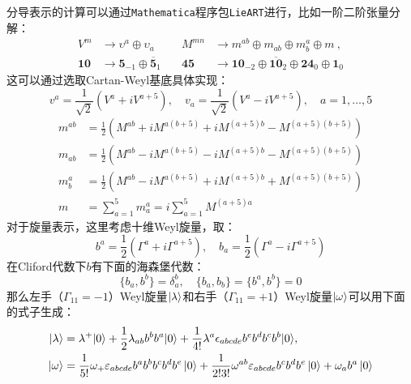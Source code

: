 分导表示的计算可以通过\texttt{Mathematica}程序包\texttt{LieART}\cite{FEGER2020107490}进行，比如一阶二阶张量分解：
\begin{equation}
	\begin{aligned}
		V^{m}&\to\upsilon^{a}\oplus\upsilon_{a}\quad&M^{mn}&\to m^{ab}\oplus m_{ab}\oplus m_{b}^{a}\oplus m\mathrm{~,}\\
		\mathbf{10}&\to\mathbf{5}_{-1}\oplus\mathbf{\overline{5}}_{1}\quad&\mathbf{45}&\to\mathbf{10}_{-2}\oplus\mathbf{\overline{10}}_{2}\oplus\mathbf{24}_{0}\oplus\mathbf{1}_{0}
		\end{aligned}
\end{equation}
这可以通过选取Cartan-Weyl基底具体实现：\cite{Nekrasov:2005wg}
\begin{equation}
	v^a=\frac{1}{\sqrt{2}}\left(V^a+iV^{a+5}\right),\quad v_a=\frac{1}{\sqrt{2}}\left(V^a-iV^{a+5}\right),\quad a=1,\ldots,5
\end{equation}
\begin{equation}
	\begin{aligned}
		m^{ab}&=\frac{1}{2}\left(M^{ab}+iM^{a(b+5)}+iM^{(a+5)b}-M^{(a+5)(b+5)}\right)\\
		m_{ab}&=\frac{1}{2}\left(M^{ab}-iM^{a(b+5)}-iM^{(a+5)b}-M^{(a+5)(b+5)}\right)\\
		m_b^a&=\frac{1}{2}\left(M^{ab}-iM^{a(b+5)}+iM^{(a+5)b}+M^{(a+5)(b+5)}\right)\\
		m&=\sum_{a=1}^5m_a^a=i\sum_{a=1}^5M^{(a+5)a}
	\end{aligned}
\end{equation}
对于旋量表示，这里考虑十维Weyl旋量，取：
\begin{equation}
	b^a=\frac{1}{2}\left(\Gamma^a+i\Gamma^{a+5}\right),\quad b_a=\frac{1}{2}\left(\Gamma^a-i\Gamma^{a+5}\right)
\end{equation}
在Cliford代数下$b$有下面的海森堡代数：
\begin{equation}
	\{b_a,b^b\}=\delta_a^b,\quad\{b_a,b_b\}=\{b^a,b^b\}=0
\end{equation}
那么左手（$\Gamma_{11}=-1$）Weyl旋量$\ket{\lambda}$和右手（$\Gamma_{11}=+1$）Weyl旋量$\ket{\omega}$可以用下面的式子生成：
\begin{equation}
	\begin{aligned}
		\left|\lambda\right\rangle&=\lambda^+|0\rangle+\frac{1}{2}\lambda_{ab}b^bb^a|0\rangle+\frac{1}{4!}\lambda^a\epsilon_{abcde}b^eb^db^cb^b|0\rangle,\\\left|{\omega}\right\rangle&=\frac{1}{5!}\omega_+\varepsilon_{abcde}b^ab^bb^cb^db^e\ket{0}+\frac{1}{2!3!}\omega^{ab}\varepsilon_{abcde}b^cb^db^e\ket{0}+\omega_ab^a\ket{0}
	\end{aligned}
\end{equation}
